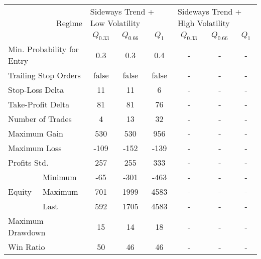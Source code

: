 \centering
\begin{tabular}{ll|cccccc}
    \toprule
    \multicolumn{2}{r|}{\multirow{2}{*}{Regime}} & \multicolumn{3}{l}{Sideways Trend + Low Volatility} & \multicolumn{3}{l}{Sideways Trend + High Volatility}  \\
    \multicolumn{2}{r|}{} & $Q_{0.33}$ & $Q_{0.66}$ & $Q_{1}$ & $Q_{0.33}$ & $Q_{0.66}$ & $Q_{1}$ \\
    \midrule
    \multicolumn{2}{l|}{Min. Probability for Entry} & 0.3 & 0.3 & 0.4 & - & - & - \\
    \multicolumn{2}{l|}{Trailing Stop Orders} & false & false & false & - & - & - \\
    \multicolumn{2}{l|}{Stop-Loss Delta} & 11 & 11 & 6 & - & - & - \\
    \multicolumn{2}{l|}{Take-Profit Delta} & 81 & 81 & 76 & - & - & - \\
    \midrule
    \multicolumn{2}{l|}{Number of Trades} & 4 & 13 & 32 & - & - & - \\
    \multicolumn{2}{l|}{Maximum Gain} & 530 & 530 & 956 & - & - & - \\
    \multicolumn{2}{l|}{Maximum Loss} & -109 & -152 & -139 & - & - & - \\
    \multicolumn{2}{l|}{Profits Std.} & 257 & 255 & 333 & - & - & - \\
    \multirow{3}{*}{Equity} & Minimum & -65 & -301 & -463 & - & - & - \\
    & Maximum & 701 & 1999 & 4583 & - & - & - \\
    & Last    & 592 & 1705 & 4583 & - & - & - \\
    \multicolumn{2}{l|}{Maximum Drawdown} & 15 & 14 & 18 & - & - & - \\
    \multicolumn{2}{l|}{Win Ratio} & 50 & 46 & 46 & - & - & - \\
    \bottomrule
\end{tabular}